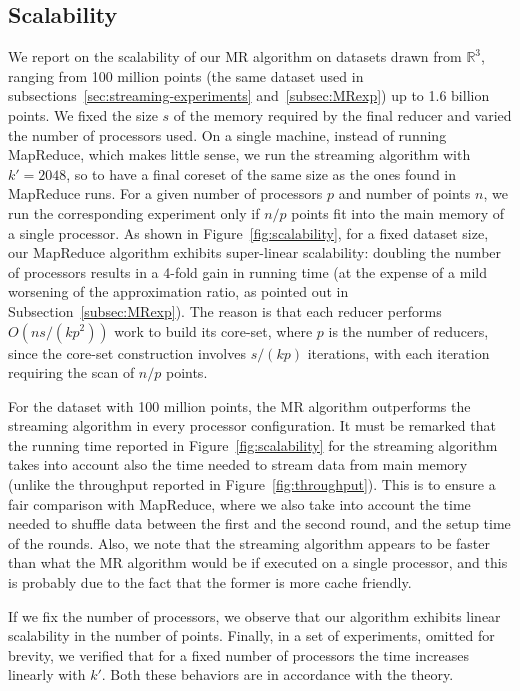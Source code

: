 \documentclass{article}
\newcommand{\BO}[1]{O\left( #1 \right)}
\begin{document}
\subsection{Scalability}

We report on the scalability of our MR algorithm on datasets drawn
from $\mathbb{R}^3$, ranging from 100 million points (the same dataset
used in subsections~\ref{sec:streaming-experiments}
and~\ref{subsec:MRexp}) up to 1.6 billion points.
We fixed the size $s$ of the memory required by the final reducer and varied the number of processors used.
On a single machine, instead of running MapReduce, which makes little sense, we run the streaming algorithm with $k'=2048$, so to have a final coreset of the same size as the ones found in MapReduce runs.
For a given number of processors $p$ and number of points $n$, we run the corresponding experiment only if $n/p$ points fit into the main memory of a single processor.
As shown in Figure~\ref{fig:scalability}, for a fixed dataset size,
our MapReduce algorithm exhibits super-linear scalability: doubling the number of processors results in a 4-fold gain in running time (at the expense of a mild worsening of the approximation ratio, as pointed out in Subsection~\ref{subsec:MRexp}).
The reason is that each reducer performs $\BO{ns/(kp^2)}$ work to
build its core-set, where $p$ is the number of reducers, since the
core-set construction involves $s/(kp)$ iterations, with each
iteration requiring the scan of $n/p$ points.

For the dataset with 100 million points, the MR algorithm outperforms
the streaming algorithm in every processor configuration. It must be
remarked that the running time reported in
Figure~\ref{fig:scalability} for the streaming algorithm takes into
account also the time needed to stream data from main memory (unlike
the throughput reported in Figure~\ref{fig:throughput}). This is to
ensure a fair comparison with MapReduce, where we also take into
account the time needed to shuffle data between the first and the
second round, and the setup time of the rounds.  Also, we
note that the streaming algorithm appears to be faster than what the
MR algorithm would be if executed on a single processor, and this is
probably due to the fact that the former is more cache
friendly.

If we fix the number of processors, we observe that our algorithm
exhibits linear scalability in the number of points.
Finally, in a set of experiments, omitted for brevity, we
verified that for a fixed number of processors the
time increases linearly with $k'$. Both these behaviors
are in accordance with the theory.
\end{document}
